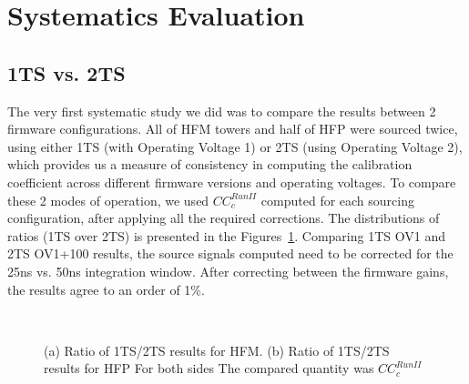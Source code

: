 \section{Systematics Evaluation}
\subsection{1TS vs. 2TS}
The very first systematic study we did was to compare the results between 2
firmware configurations. All of HFM towers and half of HFP were sourced twice,
using either 1TS (with Operating Voltage 1) or 2TS (using Operating Voltage 2),
which provides us a measure of consistency in computing the calibration
coefficient across different firmware versions and operating voltages.
To compare these 2 modes of operation, we used ${CC}^{Run II}_{c}$ computed for
each sourcing configuration, after applying all the required corrections. The
distributions of ratios (1TS over 2TS) is presented in the Figures~\ref{fig:HF_1TSto2TS}. Comparing 1TS OV1 and 2TS OV1+100 results, the source signals computed need to be corrected for the 25\unit{ns} vs. 50\unit{ns} integration window. After correcting between the firmware gains, the results agree to an order of 1\%.

\begin{figure}[!h]
    \begin{center}
        ~
        \caption
        {(a) Ratio of 1TS/2TS results for HFM.
         (b) Ratio of 1TS/2TS results for HFP
         For both sides The compared quantity was ${CC}^{Run II}_{c}$}
        \label{fig:HF_1TSto2TS}
    \end{center}
\end{figure}

